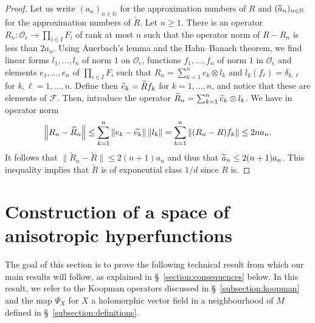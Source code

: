 \documentclass[10pt]{amsart}
\theoremstyle{definition}\newtheorem{defi}[theo]{Definition}\newtheorem{rema}[theo]{Remark}\newtheorem{exam}[theo]{Example}\newtheorem{exem}[theo]{Example}\newtheorem{nota}[theo]{Notation}
\newcommand{\n}[1]{\left\|#1\right\|}
\newcommand{\clO}{\mathcal{O}}
\newcommand{\clF}{\mathcal{F}}
\newcommand{\bbN}{\mathbb{N}}
\let\oldtilde\tilde
\renewcommand*{\tilde}[1]{\mathchoice{\widetilde{#1}}{\widetilde{#1}}{\oldtilde{#1}}{\oldtilde{#1}}}
\begin{document}
\begin{proof}
Let us write $(a_n)_{n \in \bbN}$ for the approximation numbers of $R$ and $(\tilde{a}_n)_{n \in \bbN}$ for the approximation numbers of $\widetilde{R}$. Let $n \geq 1$. There is an operator $R_n : \clO_\epsilon \to \prod_{i  \in I} F_i$ of rank at most $n$ such that the operator norm of $R - R_n$ is less than $2 a_n$. Using Auerbach's lemma and the Hahn--Banach theorem, we find linear forms $l_1, \dots, l_n$ of norm $1$ on $\clO_\epsilon$, functions $f_1, \dots, f_n$ of norm $1$ in $\clO_\epsilon$ and elements $e_1, \dots, e_n$ of $\prod_{i \in I} F_i$ such that $R_n = \sum_{k = 1}^n e_k \otimes l_k$ and $l_k(f_\ell) = \delta_{k,\ell}$ for $k,\ell = 1, \dots, n$. Define then $\tilde{e}_k = \widetilde{R} f_k$ for $k =1, \dots, n$, and notice that these are elements of $\clF$. Then, introduce the operator $\widetilde{R}_n = \sum_{k = 1}^n \tilde{e}_k \otimes l_k$. We have in operator norm
\begin{equation*}
\n{ R_n - \widetilde{R}_n} \leq \sum_{k = 1}^n \n{e_k - \tilde{e_k}} \n{l_k} = \sum_{k =1}^n \n{(R_n - R) f_k} \leq 2 n a_n.
\end{equation*}
It follows that $\|\widetilde{R}_n - \widetilde{R}\| \leq 2(n+1) a_n$ and thus that $\tilde{a}_n \leq 2(n+1) a_n$. This inequality implies that $\widetilde{R}$ is of exponential class $1/d$ since $R$ is.
\end{proof}

\section{Construction of a space of anisotropic hyperfunctions}\label{section:construction}

The goal of this section is to prove the following technical result from which our main results will follow, as explained in \S~\ref{section:consequences} below. In this result, we refer to the Koopman operators discussed in \S~\ref{subsection:koopman} and the map $\Psi_X$ for $X$ a holomorphic vector field in a neighbourhood of $M$ defined in \S~\ref{subsection:definitions}.
\end{document}
